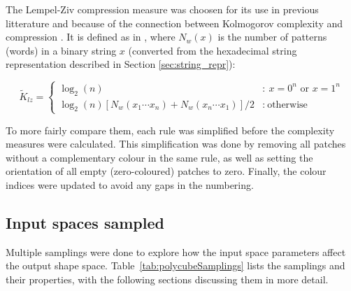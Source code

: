 The Lempel-Ziv compression measure was choosen for its use in previous litterature \cite{johnston2021, dingle2018input} and because of the connection between Kolmogorov complexity and compression \cite{johnston2021}. It is defined as in \cite{dingle2018input}, where \(N_w(x)\) is the number of patterns (words) in a binary string \(x\) (converted from the hexadecimal string representation described in Section \ref{sec:string_repr}):

\[
    \widetilde{K}_{lz} = \left\{ \begin{array}{cl}
        \log_2\left( n \right) & : \ x = 0^n \text{ or } x = 1^n \\
        \log_2\left( n \right)\left[ N_w\left( x_1\cdots x_n \right) + N_w\left( x_n\cdots x_1 \right) \right] / 2 & : \ \text{otherwise}
        \end{array} \right.
\]

To more fairly compare them, each rule was simplified before the complexity measures were calculated. This simplification was done by removing all patches without a complementary colour in the same rule, as well as setting the orientation of all empty (zero-coloured) patches to zero. Finally, the colour indices were updated to avoid any gaps in the numbering.

\subsection{Input spaces sampled}

Multiple samplings were done to explore how the input space parameters affect the output shape space. Table~\ref{tab:polycubeSamplings} lists the samplings and their properties, with the following sections discussing them in more detail.




